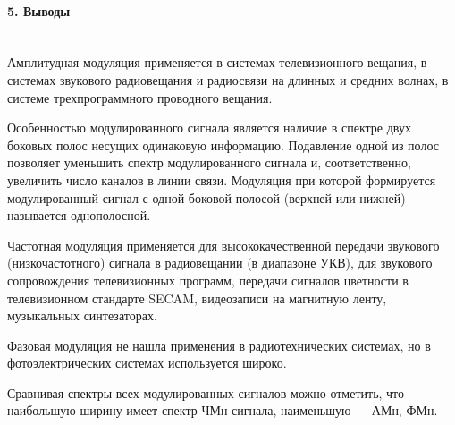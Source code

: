 \documentclass[12pt,a4paper]{report}
\begin{document}
\begin{figure}[h!]
\end{figure}

\paragraph{5. Выводы \\\\}
Амплитудная модуляция применяется в системах телевизионного вещания,
в системах звукового радиовещания и радиосвязи на длинных и средних волнах, в системе трехпрограммного проводного вещания.

Особенностью модулированного сигнала является наличие в спектре двух боковых полос несущих одинаковую информацию. Подавление одной из полос позволяет уменьшить спектр модулированного сигнала и, соответственно, увеличить число каналов в линии связи. Модуляция при которой формируется модулированный сигнал с одной боковой полосой (верхней или нижней) называется однополосной. 

Частотная модуляция применяется для высококачественной передачи звукового (низкочастотного) сигнала в радиовещании (в диапазоне УКВ), для звукового сопровождения телевизионных программ, передачи сигналов цветности в телевизионном стандарте SECAM, видеозаписи на магнитную ленту, музыкальных синтезаторах.

Фазовая модуляция не нашла применения в радиотехнических системах, но в фотоэлектрических системах используется широко.

Сравнивая спектры всех модулированных сигналов можно отметить, что наибольшую ширину имеет спектр ЧМн сигнала, наименьшую — АМн, ФМн.
\end{document}
